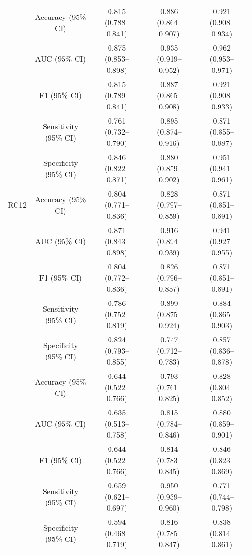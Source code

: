 \begin{table}[h]
\begin{tabular}{cc|ccc}
 \rowcolor{cusyellowl}  \multirow{1}{*}{RC11 }&Accuracy (95\% CI) & 0.815 (0.788–0.841) &0.886 (0.864–0.907)& 0.921 (0.908–0.934)\\
 \rowcolor{cusyellowl} & AUC (95\% CI) & 0.875 (0.853–0.898)&0.935 (0.919–0.952)&0.962 (0.953–0.971)\\
 \rowcolor{cusyellowl} & F1 (95\% CI) &0.815 (0.789–0.841) &0.887 (0.865–0.908) &0.921 (0.908–0.933)\\
 \rowcolor{cusyellowl} & Sensitivity (95\% CI) & 0.761 (0.732–0.790)   &0.895 (0.874–0.916) &0.871 (0.855–0.887)\\
 \rowcolor{cusyellowl} & Specificity (95\% CI) & 0.846 (0.822–0.871)  &0.880 (0.859–0.902)&0.951 (0.941–0.961)\\




\multirow{1}{*}{RC12}&Accuracy (95\% CI) & 0.804 (0.771–0.836)  &0.828 (0.797–0.859)&0.871 (0.851–0.891)\\
& AUC (95\% CI) &0.871 (0.843–0.898)& 0.916 (0.894–0.939) &0.941 (0.927–0.955) \\
& F1 (95\% CI) &0.804 (0.772–0.836)& 0.826 (0.796–0.857) & 0.871 (0.851–0.891)\\
& Sensitivity (95\% CI) &0.786 (0.752–0.819)&0.899 (0.875–0.924)& 0.884 (0.865–0.903)\\
& Specificity (95\% CI) &0.824 (0.793–0.855) & 0.747 (0.712–0.783)  &0.857 (0.836–0.878)\\



 \rowcolor{cusyellowl}  \multirow{1}{*}{RC13}&Accuracy (95\% CI) & 0.644 (0.522–0.766)&0.793 (0.761–0.825)& 0.828 (0.804–0.852)\\
 \rowcolor{cusyellowl} & AUC (95\% CI) & 0.635 (0.513–0.758)  &0.815 (0.784–0.846) &0.880 (0.859–0.901)\\
 \rowcolor{cusyellowl} & F1 (95\% CI) & 0.644 (0.522–0.766) &0.814 (0.783–0.845)&0.846 (0.823–0.869)\\
 \rowcolor{cusyellowl} & Sensitivity (95\% CI) & 0.659 (0.621–0.697)&0.950 (0.939–0.960)&0.771 (0.744–0.798)\\
 \rowcolor{cusyellowl} & Specificity (95\% CI) & 0.594 (0.468–0.719) &0.816 (0.785–0.847) &0.838 (0.814–0.861)\\

\hline 
\end{tabular} 
\label{ST_ext}
\end{table}



